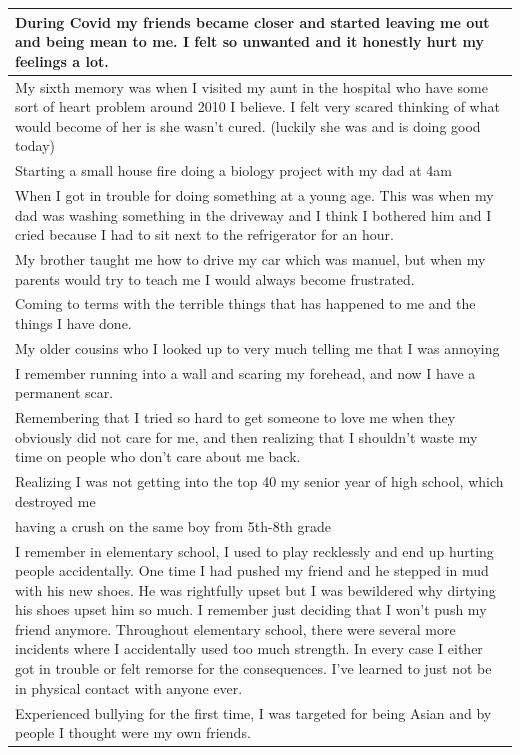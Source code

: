 \documentclass[
  .7em,
  letterpaper,
  DIV=11,
  numbers=noendperiod]{scrartcl}
\begin{document}
\begin{table}
\begin{tabular}{l}
\hline
During Covid my friends became closer and started leaving me out and being mean to me. I felt so unwanted and it honestly hurt my feelings a lot.\\
\hline
My sixth memory was when I visited my aunt in the hospital who have some sort of heart problem around 2010 I believe. I felt very scared thinking of what would become of her is she wasn't cured. (luckily she was and is doing good today)\\
\hline
Starting a small house fire doing a biology project with my dad at 4am\\
\hline
When I got in trouble for doing something at a young age. This was when my dad was washing something in the driveway and I think I bothered him and I cried because I had to sit next to the refrigerator for an hour.\\
\hline
My brother taught me how to drive my car which was manuel, but when my parents would try to teach me I would always become frustrated.\\
\hline
Coming to terms with the terrible things that has happened to me and the things I have done.\\
\hline
My older cousins who I looked up to very much telling me that I was annoying\\
\hline
I remember running into a wall and scaring my forehead, and now I have a permanent scar.\\
\hline
Remembering that I tried so hard to get someone to love me when they obviously did not care for me, and then realizing that I shouldn't waste my time on people who don't care about me back.\\
\hline
Realizing I was not getting into the top 40 my senior year of high school, which destroyed me\\
\hline
having a crush on the same boy from 5th-8th grade\\
\hline
I remember in elementary school, I used to play recklessly and end up hurting people accidentally. One time I had pushed my friend and he stepped in mud with his new shoes. He was rightfully upset but I was bewildered why dirtying his shoes upset him so much. I remember just deciding that I won’t push my friend anymore. Throughout elementary school, there were several more incidents where I accidentally used too much strength. In every case I either got in trouble or felt remorse for the consequences. I’ve learned to just not be in physical contact with anyone ever.\\
\hline
Experienced bullying for the first time, I was targeted for being Asian and by people I thought were my own friends.\\

\end{tabular}
\end{table}
\end{document}
